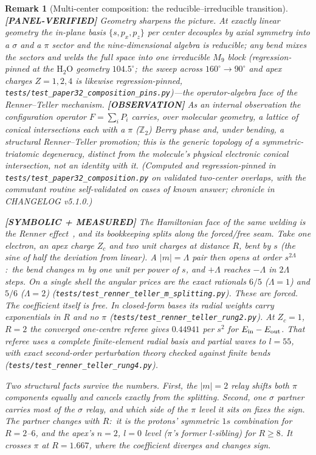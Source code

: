 \documentclass[11pt]{article}
\newtheorem{remark}{Remark}
\begin{document}
\begin{remark}[Multi-center composition: the reducible--irreducible transition]
\textbf{[PANEL-VERIFIED]} Geometry sharpens the picture.  At \emph{exactly} linear geometry the
in-plane basis $\{s, p_x, p_z\}$ per center decouples by axial symmetry
into a $\sigma$ and a $\pi$ sector and the nine-dimensional algebra is
reducible; \emph{any} bend mixes the sectors and welds the full space
into one irreducible $M_9$ block (regression-pinned at the
$\mathrm{H_2O}$ geometry $104.5^\circ$;\ the sweep across
$160^\circ \!\to\! 90^\circ$ and apex charges $Z = 1, 2, 4$ is likewise
regression-pinned, \texttt{tests/test\_paper32\_composition\_pins.py})---the operator-algebra
face of the Renner--Teller mechanism.  \textbf{[OBSERVATION]} As an internal observation the
configuration operator $F = \sum_i P_i$ carries, over molecular
geometry, a lattice of conical intersections each with a $\pi$
($\mathbb{Z}_2$) Berry phase and, under bending, a structural
Renner--Teller promotion; this is the \emph{generic} topology of a
symmetric-triatomic degeneracy, distinct from the molecule's physical
electronic conical intersection, not an identity with it.  (Computed and
regression-pinned in \texttt{tests/test\_paper32\_composition.py} on
validated two-center overlaps, with the commutant routine self-validated
on cases of known answer; chronicle in CHANGELOG v5.1.0.)

\textbf{[SYMBOLIC + MEASURED]} The Hamiltonian face of the same welding is
the Renner effect~\cite{renner1934}, and its bookkeeping splits along the
forced/free seam.  Take one electron, an apex charge $Z_c$ and two unit
charges at distance $R$, bent by $s$ (the sine of half the deviation from
linear).  A $|m| = \Lambda$ pair then opens at order $s^{2\Lambda}$:\ the
bend changes $m$ by one unit per power of $s$, and $+\Lambda$ reaches
$-\Lambda$ in $2\Lambda$ steps.  On a single shell the angular prices are
the exact rationals $6/5$ ($\Lambda = 1$) and $5/6$ ($\Lambda = 2$)
(\texttt{tests/test\_renner\_teller\_m\_splitting.py}).  These are forced.
The coefficient itself is free.  In closed-form bases its radial weights
carry exponentials in $R$ and no $\pi$
(\texttt{tests/test\_renner\_teller\_rung2.py}).  At $Z_c = 1$, $R = 2$ the
converged one-centre referee gives $0.44941$ per $s^2$ for
$E_{\rm in} - E_{\rm out}$.  That referee uses a complete finite-element
radial basis and partial waves to $l = 55$, with exact second-order
perturbation theory checked against finite bends
(\texttt{tests/test\_renner\_teller\_rung4.py}).

Two structural facts survive the numbers.  First, the $|m| = 2$ relay
shifts both $\pi$ components equally and cancels exactly from the
splitting.  Second, one $\sigma$ partner carries most of the $\sigma$
relay, and which side of the $\pi$ level it sits on fixes the sign.  The
partner changes with $R$:\ it is the protons' symmetric $1s$ combination
for $R = 2$--$6$, and the apex's $n = 2$, $l = 0$ level ($\pi$'s former
$l$-sibling) for $R \ge 8$.  It crosses $\pi$ at $R = 1.667$, where the
coefficient diverges and changes sign.


\end{remark}
\end{document}
